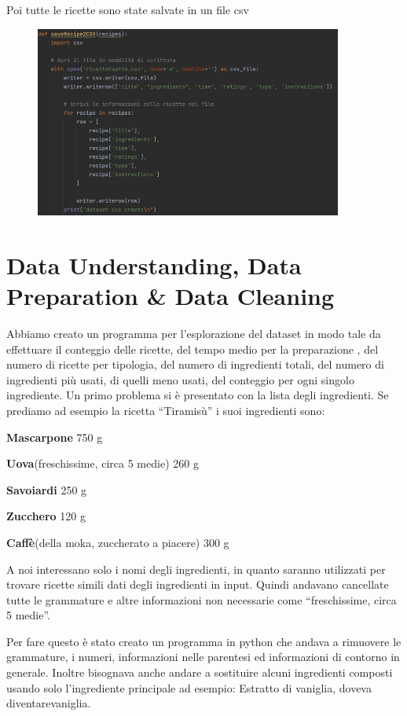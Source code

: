 \documentclass[12pt]{report}
\begin{document}
Poi tutte le ricette sono state salvate in un file csv
    \begin{figure}[H]
        \centering
        {\includegraphics[width=0.9\textwidth]{img/img3.jpg}}
    \end{figure}



\section{Data Understanding, Data Preparation \& Data Cleaning}
Abbiamo creato un programma per l’esplorazione del dataset in modo tale da effettuare il conteggio delle ricette, del tempo medio per la preparazione , del numero di ricette per tipologia, del numero di ingredienti totali, del numero di ingredienti più usati, di quelli meno usati, del conteggio per ogni singolo ingrediente. 
Un primo problema si è presentato con la lista degli ingredienti. Se prediamo ad esempio la ricetta “Tiramisù” i suoi ingredienti sono: 

\textbf{Mascarpone} 750 g

\textbf{Uova}(freschissime, circa 5 medie) 260 g

\textbf{Savoiardi} 250 g

\textbf{Zucchero} 120 g

\textbf{Caffè}(della moka, zuccherato a piacere) 300 g

A noi interessano solo i nomi degli ingredienti, in quanto saranno utilizzati per trovare ricette simili dati degli ingredienti in input. Quindi andavano cancellate tutte le grammature e altre informazioni non necessarie come “freschissime, circa 5 medie”.

Per fare questo è stato creato un programma in python che andava a rimuovere le grammature, i numeri, informazioni nelle parentesi ed informazioni di contorno in generale. Inoltre bisognava anche andare a sostituire alcuni ingredienti composti usando solo l’ingrediente principale ad esempio: Estratto di vaniglia, doveva diventarevaniglia. 
\end{document}
